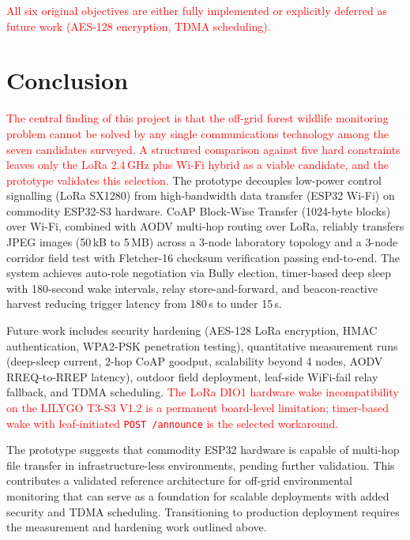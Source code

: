 \documentclass[12pt,a4paper]{article}
\DeclareRobustCommand{\changed}[1]{\textcolor{red}{#1}}
\begin{document}
\changed{All six original objectives are either fully implemented or explicitly deferred as future work (AES-128 encryption, TDMA scheduling).}



\section{Conclusion}

\changed{The central finding of this project is that the off-grid forest wildlife monitoring problem cannot be solved by any single communications technology among the seven candidates surveyed. A structured comparison against five hard constraints leaves only the LoRa 2.4\,GHz plus Wi-Fi hybrid as a viable candidate, and the prototype validates this selection.}
The prototype decouples low-power control signalling (LoRa SX1280) from high-bandwidth data transfer (ESP32 Wi-Fi) on commodity ESP32-S3 hardware. CoAP Block-Wise Transfer (1024-byte blocks) over Wi-Fi, combined with AODV multi-hop routing over LoRa, reliably transfers JPEG images (50\,kB to 5\,MB) across a 3-node laboratory topology and a 3-node corridor field test with Fletcher-16 checksum verification passing end-to-end. The system achieves auto-role negotiation via Bully election, timer-based deep sleep with 180-second wake intervals, relay store-and-forward, and beacon-reactive harvest reducing trigger latency from 180\,s to under 15\,s.

Future work includes security hardening (AES-128 LoRa encryption, HMAC authentication, WPA2-PSK penetration testing), quantitative measurement runs (deep-sleep current, 2-hop CoAP goodput, scalability beyond 4 nodes, AODV RREQ-to-RREP latency), outdoor field deployment, leaf-side WiFi-fail relay fallback, and TDMA scheduling. \changed{The LoRa DIO1 hardware wake incompatibility on the LILYGO T3-S3 V1.2 is a permanent board-level limitation; timer-based wake with leaf-initiated \texttt{POST /announce} is the selected workaround.}

The prototype suggests that commodity ESP32 hardware is capable of multi-hop file transfer in infrastructure-less environments, pending further validation. This contributes a validated reference architecture for off-grid environmental monitoring that can serve as a foundation for scalable deployments with added security and TDMA scheduling. Transitioning to production deployment requires the measurement and hardening work outlined above.

\newpage
\end{document}
